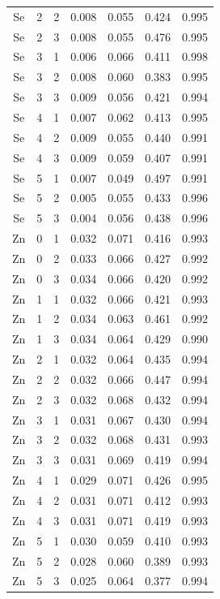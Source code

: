 \documentclass[ms, hidelinks]{uncgdissertationexp}
\theoremstyle{plain}
\theoremstyle{definition}
\theoremstyle{remark}
\begin{document}
\begin{longtable}{ccccccc}
Se & 2 & 2 & 0.008 & 0.055 & 0.424 & 0.995\\
\rowcolor{gray!6}  Se & 2 & 3 & 0.008 & 0.055 & 0.476 & 0.995\\
Se & 3 & 1 & 0.006 & 0.066 & 0.411 & 0.998\\
\rowcolor{gray!6}  Se & 3 & 2 & 0.008 & 0.060 & 0.383 & 0.995\\
Se & 3 & 3 & 0.009 & 0.056 & 0.421 & 0.994\\
\rowcolor{gray!6}  Se & 4 & 1 & 0.007 & 0.062 & 0.413 & 0.995\\
Se & 4 & 2 & 0.009 & 0.055 & 0.440 & 0.991\\
\rowcolor{gray!6}  Se & 4 & 3 & 0.009 & 0.059 & 0.407 & 0.991\\
Se & 5 & 1 & 0.007 & 0.049 & 0.497 & 0.991\\
\rowcolor{gray!6}  Se & 5 & 2 & 0.005 & 0.055 & 0.433 & 0.996\\
Se & 5 & 3 & 0.004 & 0.056 & 0.438 & 0.996\\
\rowcolor{gray!6}  Zn & 0 & 1 & 0.032 & 0.071 & 0.416 & 0.993\\
Zn & 0 & 2 & 0.033 & 0.066 & 0.427 & 0.992\\
\rowcolor{gray!6}  Zn & 0 & 3 & 0.034 & 0.066 & 0.420 & 0.992\\
Zn & 1 & 1 & 0.032 & 0.066 & 0.421 & 0.993\\
\rowcolor{gray!6}  Zn & 1 & 2 & 0.034 & 0.063 & 0.461 & 0.992\\
Zn & 1 & 3 & 0.034 & 0.064 & 0.429 & 0.990\\
\rowcolor{gray!6}  Zn & 2 & 1 & 0.032 & 0.064 & 0.435 & 0.994\\
Zn & 2 & 2 & 0.032 & 0.066 & 0.447 & 0.994\\
\rowcolor{gray!6}  Zn & 2 & 3 & 0.032 & 0.068 & 0.432 & 0.994\\
Zn & 3 & 1 & 0.031 & 0.067 & 0.430 & 0.994\\
\rowcolor{gray!6}  Zn & 3 & 2 & 0.032 & 0.068 & 0.431 & 0.993\\
Zn & 3 & 3 & 0.031 & 0.069 & 0.419 & 0.994\\
\rowcolor{gray!6}  Zn & 4 & 1 & 0.029 & 0.071 & 0.426 & 0.995\\
Zn & 4 & 2 & 0.031 & 0.071 & 0.412 & 0.993\\
\rowcolor{gray!6}  Zn & 4 & 3 & 0.031 & 0.071 & 0.419 & 0.993\\
Zn & 5 & 1 & 0.030 & 0.059 & 0.410 & 0.993\\
\rowcolor{gray!6}  Zn & 5 & 2 & 0.028 & 0.060 & 0.389 & 0.993\\
Zn & 5 & 3 & 0.025 & 0.064 & 0.377 & 0.994\\*
\end{longtable}
\end{document}
